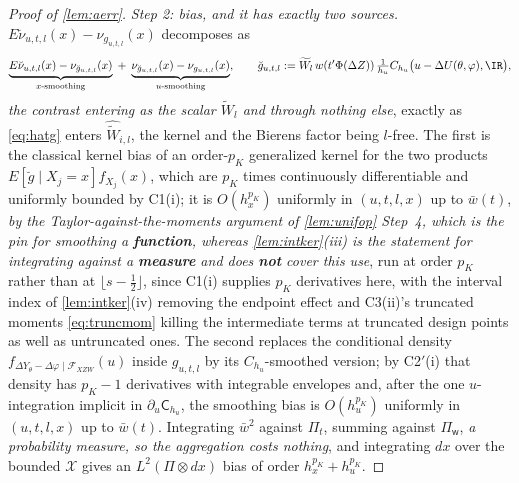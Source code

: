 \begin{proof}[Proof of \cref{lem:aerr}]
\emph{Step 2: bias, and it has exactly two sources.} $E\breve\nu_{u,t,l}(x)-\nu_{g_{u,t,l}}(x)$ decomposes
as
\[
\underbrace{E\breve\nu_{u,t,l}(x)-\nu_{\breve g_{u,t,l}}(x)}_{\text{$x$-smoothing}}
\;+\;\underbrace{\nu_{\breve g_{u,t,l}}(x)-\nu_{g_{u,t,l}}(x)}_{\text{$u$-smoothing}},
\qquad
\breve g_{u,t,l}:=\widetilde W_l\,w(t'\Phi(\Delta Z))\,\tfrac1{h_u}C_{h_u}\big(u-\Delta U(\theta,\varphi),\IR\big),
\]
\emph{the contrast entering as the scalar $\widetilde W_l$ and through nothing else}, exactly as
\eqref{eq:hatg} enters $\widehat{\widetilde W}_{i,l}$, the kernel and the Bierens factor being $l$-free.
The first is the classical kernel bias of an order-$p_K$ generalized kernel for the two products
$E[\breve g\mid X_j=x]f_{X_j}(x)$, which are $p_K$ times continuously differentiable and uniformly
bounded by C1(i); it is $O(h_x^{p_K})$ uniformly in $(u,t,l,x)$ up to $\bar w(t)$, \emph{by the
Taylor-against-the-moments argument of \cref{lem:unifop} Step~4, which is the pin for smoothing a
\textbf{function}, whereas \cref{lem:intker}(iii) is the statement for integrating against a
\textbf{measure} and does \textbf{not} cover this use}, run at order $p_K$ rather than
at $\lfloor s-\tfrac12\rfloor$, since C1(i) supplies $p_K$ derivatives here, with the interval index of
\cref{lem:intker}(iv) removing the endpoint effect and C3(ii)'s truncated moments \eqref{eq:truncmom}
killing the intermediate terms at truncated design points as well as untruncated ones.
The second replaces the conditional density
$f_{\Delta Y_\theta-\Delta\varphi\mid\mathcal F_{XZW}}(u)$ inside $g_{u,t,l}$ by its $C_{h_u}$-smoothed
version; by C2$'$(i) that density has $p_K-1$ derivatives with integrable envelopes and, after the one
$u$-integration implicit in $\partial_u\mathsf C_{h_u}$, the smoothing bias is $O(h_u^{p_K})$ uniformly
in $(u,t,l,x)$ up to $\bar w(t)$. Integrating $\bar w^{2}$ against $\Pi_t$, summing against
$\Pi_{\mathsf w}$, \emph{a probability measure, so the aggregation costs nothing}, and
integrating $dx$ over the bounded
$\mathcal X$ gives an $L^{2}(\Pi\otimes dx)$ bias of order $h_x^{p_K}+h_u^{p_K}$.


\end{proof}
